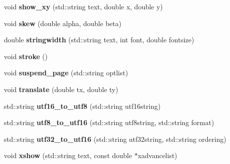 \begin{DoxyCompactItemize}
\item 
\hypertarget{classPDFlib_a28f2a9cae7188472df3a0d75e7bac6ac}{void {\bfseries show\-\_\-xy} (std\-::string text, double x, double y)}\label{classPDFlib_a28f2a9cae7188472df3a0d75e7bac6ac}

\item 
\hypertarget{classPDFlib_a66323e008c1980539c58a2647af31b1a}{void {\bfseries skew} (double alpha, double beta)}\label{classPDFlib_a66323e008c1980539c58a2647af31b1a}

\item 
\hypertarget{classPDFlib_afd8b4b2ff6fa254cc386047bddfbede1}{double {\bfseries stringwidth} (std\-::string text, int font, double fontsize)}\label{classPDFlib_afd8b4b2ff6fa254cc386047bddfbede1}

\item 
\hypertarget{classPDFlib_ab212bd6e1bc82f8f00f807438218bc5d}{void {\bfseries stroke} ()}\label{classPDFlib_ab212bd6e1bc82f8f00f807438218bc5d}

\item 
\hypertarget{classPDFlib_ac047054d3779c38b144b3f5dbd6b81b8}{void {\bfseries suspend\-\_\-page} (std\-::string optlist)}\label{classPDFlib_ac047054d3779c38b144b3f5dbd6b81b8}

\item 
\hypertarget{classPDFlib_abcecfeb7a7e76092ffe5e222dbcbea25}{void {\bfseries translate} (double tx, double ty)}\label{classPDFlib_abcecfeb7a7e76092ffe5e222dbcbea25}

\item 
\hypertarget{classPDFlib_a6e89b9ae91f51bed2a1b8c70d97f8695}{std\-::string {\bfseries utf16\-\_\-to\-\_\-utf8} (std\-::string utf16string)}\label{classPDFlib_a6e89b9ae91f51bed2a1b8c70d97f8695}

\item 
\hypertarget{classPDFlib_a2a54d9d3e07de9f742f051d5a309f3aa}{std\-::string {\bfseries utf8\-\_\-to\-\_\-utf16} (std\-::string utf8string, std\-::string format)}\label{classPDFlib_a2a54d9d3e07de9f742f051d5a309f3aa}

\item 
\hypertarget{classPDFlib_acc2113856143eca950789a3ac33cc1ec}{std\-::string {\bfseries utf32\-\_\-to\-\_\-utf16} (std\-::string utf32string, std\-::string ordering)}\label{classPDFlib_acc2113856143eca950789a3ac33cc1ec}

\item 
\hypertarget{classPDFlib_aa4dc2e0ce0aed19151b9bc7ea8824e0f}{void {\bfseries xshow} (std\-::string text, const double $\ast$xadvancelist)}\label{classPDFlib_aa4dc2e0ce0aed19151b9bc7ea8824e0f}

\end{DoxyCompactItemize}


